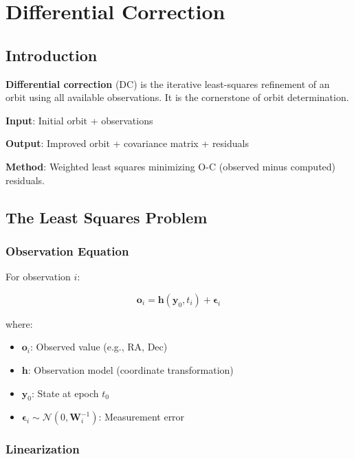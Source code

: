 \chapter{Differential Correction}
\label{ch:differential_correction}

\section{Introduction}

\textbf{Differential correction} (DC) is the iterative least-squares refinement of an orbit using all available observations. It is the cornerstone of orbit determination.

\textbf{Input}: Initial orbit + observations

\textbf{Output}: Improved orbit + covariance matrix + residuals

\textbf{Method}: Weighted least squares minimizing O-C (observed minus computed) residuals.

\section{The Least Squares Problem}

\subsection{Observation Equation}

For observation $i$:

\begin{equation}
    \mathbf{o}_i = \mathbf{h}(\mathbf{y}_0, t_i) + \boldsymbol{\epsilon}_i
\end{equation}

where:
\begin{itemize}
    \item $\mathbf{o}_i$: Observed value (e.g., RA, Dec)
    \item $\mathbf{h}$: Observation model (coordinate transformation)
    \item $\mathbf{y}_0$: State at epoch $t_0$
    \item $\boldsymbol{\epsilon}_i \sim \mathcal{N}(0, \mathbf{W}_i^{-1})$: Measurement error
\end{itemize}

\subsection{Linearization}

